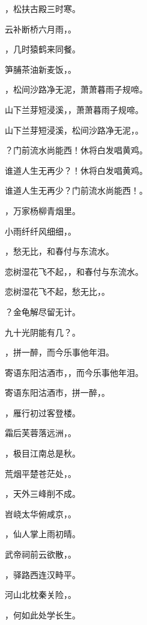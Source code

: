 \documentclass[12pt, a4paper, addpoints]{exam}
\begin{document}
\begin{questions}
\question[3] \fillin，松扶古殿三时寒。

\question[3] 云补断桥六月雨，\fillin。

\question[3] \fillin，几时猿鹤来同餐。

\question[3] 笋脯茶油新麦饭，\fillin。

\question[3] \fillin，松间沙路净无泥，萧萧暮雨子规啼。

\question[3] 山下兰芽短浸溪，\fillin，萧萧暮雨子规啼。

\question[3] 山下兰芽短浸溪，松间沙路净无泥，\fillin。

\question[3] \fillin？门前流水尚能西！休将白发唱黄鸡。

\question[3] 谁道人生无再少？\fillin！休将白发唱黄鸡。

\question[3] 谁道人生无再少？门前流水尚能西！\fillin。

\question[3] \fillin，万家杨柳青烟里。

\question[3] 小雨纤纤风细细，\fillin。

\question[3] \fillin，愁无比，和春付与东流水。

\question[3] 恋树湿花飞不起，\fillin，和春付与东流水。

\question[3] 恋树湿花飞不起，愁无比，\fillin。

\question[3] \fillin？金龟解尽留无计。

\question[3] 九十光阴能有几？\fillin。

\question[3] \fillin，拼一醉，而今乐事他年泪。

\question[3] 寄语东阳沽酒市，\fillin，而今乐事他年泪。

\question[3] 寄语东阳沽酒市，拼一醉，\fillin。

\question[3] \fillin，雁行初过客登楼。

\question[3] 霜后芙蓉落远洲，\fillin。

\question[3] \fillin，极目江南总是秋。

\question[3] 荒烟平楚苍茫处，\fillin。

\question[3] \fillin，天外三峰削不成。

\question[3] 岧峣太华俯咸京，\fillin。

\question[3] \fillin，仙人掌上雨初晴。

\question[3] 武帝祠前云欲散，\fillin。

\question[3] \fillin，驿路西连汉畤平。

\question[3] 河山北枕秦关险，\fillin。

\question[3] \fillin，何如此处学长生。


\end{questions}
\end{document}
